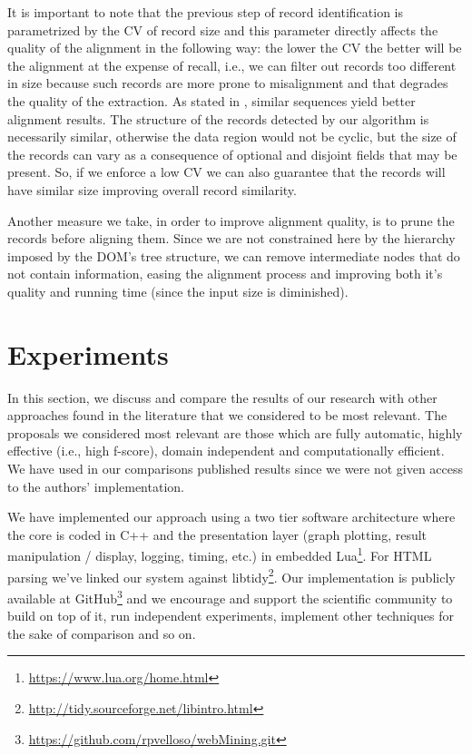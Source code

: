 \vspace{-0.3cm}

It is important to note that the previous step of record identification
is parametrized by the CV of record size and this parameter directly affects the
quality of the alignment in the following way: the lower the CV the better will
be the alignment at the expense of recall, i.e., we can filter out records too
different in size because such records are more prone to misalignment and that
degrades the quality of the extraction. As stated in \cite{centerstar1993}, 
similar sequences yield better alignment results. The structure of the
records detected by our algorithm is necessarily similar, otherwise the
data region would not be cyclic, but the size of the records can vary as a
consequence of optional and disjoint fields that may be present.
So, if we enforce a low CV we can also guarantee that the records will have
similar size improving overall record similarity.

Another measure we take, in order to improve alignment quality, is to prune the
records before aligning them. Since we are not constrained here by the hierarchy
imposed by the DOM's tree structure, we can remove intermediate nodes that do
not contain information, easing the alignment process and improving both it's
quality and running time (since the input size is diminished).

\section{Experiments}\label{sec:result}

In this section, we discuss and compare the results of our research with other
approaches found in the literature that we considered to be most relevant. The
proposals we considered most relevant are those which are fully automatic,
highly effective (i.e., high f-score), domain independent and computationally
efficient. We have used in our comparisons published results since we were not
given access to the authors' implementation.

We have implemented our approach using a two tier software architecture where
the core is coded in C++ and the presentation layer (graph plotting, result
manipulation / display, logging, timing, etc.) in embedded
Lua\footnote{\url{https://www.lua.org/home.html}}.
For HTML parsing we've linked our system against
libtidy\footnote{\url{http://tidy.sourceforge.net/libintro.html}}. Our
implementation is publicly available at
GitHub\footnote{\url{https://github.com/rpvelloso/webMining.git}} and we
encourage and support the scientific community to build on top of it, run
independent experiments, implement other techniques for the sake of comparison
and so on.

